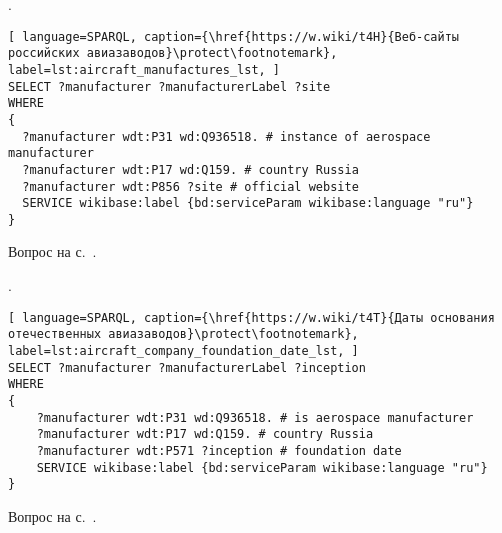 \begin{task}
    \label{answer:aircraft_manufacturers}
    . 
    
	\begin{lstlisting}[ language=SPARQL, caption={\href{https://w.wiki/t4H}{Веб-сайты российских авиазаводов}\protect\footnotemark}, label=lst:aircraft_manufactures_lst, ]
SELECT ?manufacturer ?manufacturerLabel ?site
WHERE
{
  ?manufacturer wdt:P31 wd:Q936518. # instance of aerospace manufacturer
  ?manufacturer wdt:P17 wd:Q159. # country Russia
  ?manufacturer wdt:P856 ?site # official website
  SERVICE wikibase:label {bd:serviceParam wikibase:language "ru"}
}
\end{lstlisting}
    
    \small{Вопрос на с.~\pageref{lst:lang2}.}
\end{task}

\begin{task}
    \label{answer:aircraft_company_foundation_date}
    . 
    
	\begin{lstlisting}[ language=SPARQL, caption={\href{https://w.wiki/t4T}{Даты основания отечественных авиазаводов}\protect\footnotemark}, label=lst:aircraft_company_foundation_date_lst, ]
SELECT ?manufacturer ?manufacturerLabel ?inception
WHERE
{
    ?manufacturer wdt:P31 wd:Q936518. # is aerospace manufacturer
  	?manufacturer wdt:P17 wd:Q159. # country Russia
  	?manufacturer wdt:P571 ?inception # foundation date
    SERVICE wikibase:label {bd:serviceParam wikibase:language "ru"}
}
\end{lstlisting}
    
    \small{Вопрос на с.~\pageref{aircraft_question_2}.}
\end{task}

